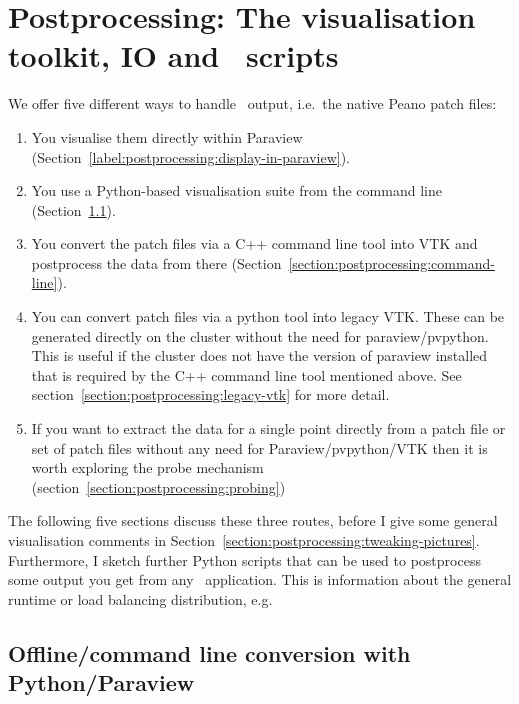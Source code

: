 \chapter{Postprocessing: The visualisation toolkit, IO and \Peano\
scripts}
\label{chapter:postprocessing}


We offer five different ways to handle \Peano\ output, i.e.~the native Peano
patch files:

\begin{enumerate}
  \item You visualise them directly within Paraview (Section~\ref{label:postprocessing:display-in-paraview}).
  \item You use a Python-based visualisation suite from the command line
  (Section~\ref{label:postprocessing:convert-with-paraview}).
  \item You convert the patch files via a C++ command line tool into VTK and
  postprocess the data from there
  (Section~\ref{section:postprocessing:command-line}).
  \item You can convert patch files via a python tool into legacy VTK. These can be generated directly on the cluster without the need for paraview/pvpython. This is useful if the cluster does not have the version of paraview installed that is required by the C++ command line tool mentioned above. See section~\ref{section:postprocessing:legacy-vtk} for more detail.
  \item If you want to extract the data for a single point directly from a patch file or set of patch files without any need for Paraview/pvpython/VTK then it is worth exploring the probe mechanism (section~\ref{section:postprocessing:probing})
\end{enumerate}


\noindent
The following five sections discuss these three routes, before I give some
general visualisation comments in
Section~\ref{section:postprocessing:tweaking-pictures}. 
Furthermore, I sketch further Python scripts that can be used to postprocess
some output you get from any \Peano\ application.
This is information about the general runtime or load balancing distribution,
e.g.



\section{Offline/command line conversion with Python/Paraview}
\label{label:postprocessing:convert-with-paraview}

